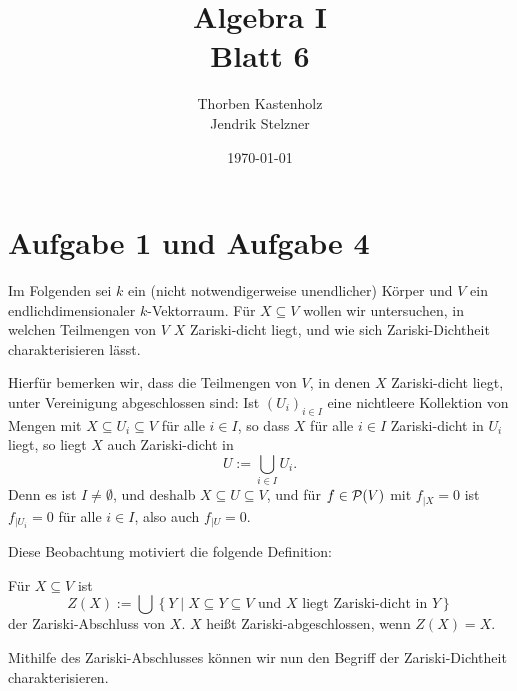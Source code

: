 \documentclass[a4paper,10pt]{article}
\title{\sc Algebra I \\ \Large Blatt 6}
\author{Thorben Kastenholz \\ Jendrik Stelzner}
\date{\today}
\begin{document}
\maketitle





\addtocounter{section}{1}
\section*{Aufgabe 1 und Aufgabe 4}
Im Folgenden sei $k$ ein (nicht notwendigerweise unendlicher) Körper und $V$ ein endlichdimensionaler $k$-Vektorraum. Für $X \subseteq V$ wollen wir untersuchen, in welchen Teilmengen von $V$ $X$ Zariski-dicht liegt, und wie sich Zariski-Dichtheit charakterisieren lässt.

Hierfür bemerken wir, dass die Teilmengen von $V$, in denen $X$ Zariski-dicht liegt, unter Vereinigung abgeschlossen sind: Ist $(U_i)_{i \in I}$ eine nichtleere Kollektion von Mengen mit $X \subseteq U_i \subseteq V$ für alle $i \in I$, so dass $X$ für alle $i \in I$ Zariski-dicht in $U_i$ liegt, so liegt $X$ auch Zariski-dicht in
\[
 U := \bigcup_{i \in I} U_i.
\]
Denn es ist $I \neq \emptyset$, und deshalb $X \subseteq U \subseteq V$, und für $f \in \mathcal{P}(V)$ mit $f_{|X} = 0$ ist $f_{|U_i} = 0$ für alle $i \in I$, also auch $f_{|U} = 0$.

Diese Beobachtung motiviert die folgende Definition:

\begin{defi}
 Für $X \subseteq V$ ist
 \[
  Z(X) := \bigcup \left\{ Y \mid X \subseteq Y \subseteq V \text{ und $X$ liegt Zariski-dicht in $Y$} \right\}
 \]
 der Zariski-Abschluss von $X$. $X$ heißt Zariski-abgeschlossen, wenn $Z(X) = X$.
\end{defi}


Mithilfe des Zariski-Abschlusses können wir nun den Begriff der Zariski-Dichtheit charakterisieren.
\end{document}
